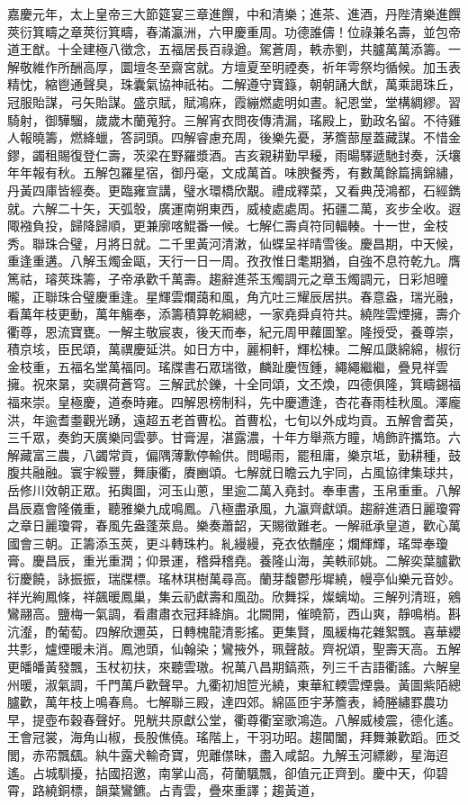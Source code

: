 \begin{pinyinscope}
嘉慶元年，太上皇帝三大節筵宴三章進饌，中和清樂；進茶、進酒，丹陛清樂進饌莢衍箕疇之章莢衍箕疇，春滿瀛洲，六甲慶重周。功德誰儔！位祿兼名壽，並包帝道王猷。十全建極八徵念，五福居長百祿遒。駕蒼周，軼赤劉，共臚萬萬添籌。一解敬維作所酬高厚，圜壇冬至齋宮就。方壇夏至明禋奏，祈年雩祭均循候。加玉表精忱，縮鬯通聲臭，珠囊氣協神祇祐。二解遵守寶籙，朝朝誦大猷，萬乘謁珠丘，冠服貽謀，弓矢貽謀。盛京賦，賦鴻庥，霞繃燃處明如晝。紀恩堂，堂構綢繆。習騎射，御驊騮，歲歲木蘭蒐狩。三解宵衣問夜傳清漏，瑤殿上，勤政名留。不待雞人報曉籌，燃絳蠟，答詞頭。四解睿慮充周，後樂先憂，茅簷蔀屋蓋藏謀。不惜金鏐，蠲租賜復登仁壽，茨梁在野羅漿酒。吉亥親耕勤早耰，雨暘驛遞馳封奏，沃壤年年報有秋。五解包羅星宿，御丹毫，文成萬首。味腴餐秀，有數萬餘篇摛錦繡，丹黃四庫皆經奏。更臨雍宣講，璧水環橋欣覯。禮成釋菜，又看典茂鴻都，石經鐫就。六解二十矢，天弧彀，廣運南朔東西，威棱處處周。拓疆二萬，亥步全收。遐陬襁負投，歸降歸順，更兼廓喀鯤番一候。七解仁壽貞符同輻輳。十一世，金枝秀。聯珠合璧，月將日就。二千里黃河清潄，仙蝶呈祥晴雪後。慶昌期，中天候，重逢重遘。八解玉燭金甌，天行一日一周。孜孜惟日耄期猶，自強不息符乾九。膺篤祜，璿莢珠籌，子帝承歡千萬壽。趨辭進茶玉燭調元之章玉燭調元，日彩旭曈曨，正聯珠合璧慶重逢。星輝雲爛藹和風，角亢吐三耀辰居拱。春意盎，瑞光融，看萬年枝更動，萬年觴奉，添籌積算乾綱總，一家堯舜貞符共。繞陛雲煙擁，壽介衢尊，恩流寶甕。一解主敬宸衷，後天而奉，紀元周甲蘿圖鞏。隆授受，養尊崇，積京垓，臣民頌，萬禩慶延洪。如日方中，麗桐軒，輝松棟。二解瓜瓞綿綿，椒衍金枝重，五福名堂萬福同。瑤牒書石眾瑞徵，麟趾慶恆鍾，繩繩繼繼，疊見祥雲擁。祝來晜，奕禩荷蒼穹。三解武於鑠，十全同頌，文丕煥，四德俱隆，箕疇錫福福來崇。皇極慶，道泰時雍。四解恩榜制科，先中慶遭逢，杏花春雨桂秋風。澤龐洪，年逾耆耋觀光踴，遠超五老首曹松。首曹松，七旬以外成均貢。五解會耆英，三千眾，奏鈞天廣樂同雲夢。甘膏渥，湛露濃，十年方舉燕方瞳，鳩飾許攜筇。六解藏富三農，八蠲常貢，偏隅薄歉停輸供。問暘雨，罷租庸，樂京坻，勤耕種，鼓腹共融融。寰宇綏豐，舞康衢，賡豳頌。七解就日瞻云九宇同，占風協律集球共，岳修川效朝正眾。拓輿圖，河玉山蔥，里逾二萬入堯封。奉車書，玉帛重重。八解昌辰嘉會隆儀重，聽雅樂九成鳴鳳。八極盡承風，九瀛齊獻頌。趨辭進酒日麗瓊霄之章日麗瓊霄，春風先盎蓬萊島。樂奏蕭韶，天賜徵難老。一解祗承皇道，歡心萬國會三朝。正籌添玉莢，更斗轉珠杓。糺縵縵，兗衣依黼座；爛輝輝，瑤斝奉瓊膏。慶昌辰，重光重潤；仰景運，稽舜稽堯。養隆山海，美軼祁姚。二解奕葉臚歡衍慶饒，詠振振，瑞牒標。瑤林琪樹萬尋高。蘭芽馥鬱彤墀繞，幔亭仙樂元音妙。祥光絢鳳條，祥飆暖鳳巢，集云礽獻壽和風劭。欣舞採，燦螭坳。三解列清班，鵷鸞翮高。鹽梅一氣調，看肅肅衣冠拜絳旓。北闕開，催曉箭，西山爽，靜鳴梢。斟沆瀣，酌葡萄。四解欣邇英，日轉槐龍清影搖。更集賢，風緩梅花雜絮飄。喜華纓共彯，爐煙暖未消。鳳池頭，仙翰染；鸞掖外，珮聲敲。齊祝頌，聖壽天高。五解更皤皤黃發飄，玉杖初扶，來聽雲璈。祝萬八昌期鎬燕，列三千吉語衢謠。六解皇州暖，淑氣調，千門萬戶歡聲早。九衢初旭笸光繞，東華紅輭雲煙裊。黃圖紫陌總臚歡，萬年枝上鳴春鳥。七解聯三殿，達四郊。綿區匝宇茅簷表，綺塍繡罫農功早，提壺布穀春聲好。兕觥共原獻公堂，衢尊衢室歌鴻造。八解威棱震，德化遙。王會冠裳，海角山椒，長股僬僥。瑤階上，干羽功昭。趨閶闔，拜舞兼歡蹈。匝爻閭，赤帟飄颻。紈牛露犬輸奇寶，兜離僸昧，盡入咸韶。九解玉河縹緲，星海迢遙。占城馴擾，拈國招邀，南掌山高，荷蘭颿飄，卻值元正齊到。慶中天，仰碧霄，路繞銅標，韻葉鸞鑣。占青雲，疊來重譯；趨黃道，
\end{pinyinscope}
